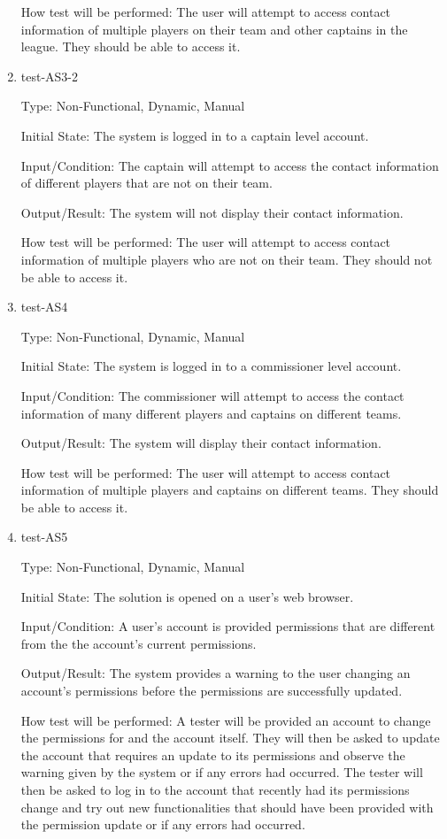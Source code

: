 \documentclass[12pt, titlepage]{article}
\begin{document}
\begin{enumerate}
  How test will be performed: The user will attempt to access contact
  information of multiple players on their team and other captains in the
  league. They should be able to access it.

  \item{test-AS3-2\\}

  Type: Non-Functional, Dynamic, Manual

  Initial State: The system is logged in to a captain level account.

  Input/Condition: The captain will attempt to access the contact information
  of different players that are not on their team.

  Output/Result: The system will not display their contact information.

  How test will be performed: The user will attempt to access contact
  information of multiple players who are not on their team. They should not
  be able to access it.

  \item{test-AS4\\}

  Type: Non-Functional, Dynamic, Manual

  Initial State: The system is logged in to a commissioner level account.

  Input/Condition: The commissioner will attempt to access the contact
  information of many different players and captains on different teams.

  Output/Result: The system will display their contact information.

  How test will be performed: The user will attempt to access contact
  information of multiple players and captains on different teams. They should
  be able to access it.

  \item{test-AS5\\}

  Type: Non-Functional, Dynamic, Manual

  Initial State: The solution is opened on a user's web browser.

  Input/Condition: A user's account is provided permissions that are different from the
  the account's current permissions.

  Output/Result: The system provides a warning to the user changing an account's
  permissions before the permissions are successfully updated.

  How test will be performed: A tester will be provided an account to change the
  permissions for and the account itself. They will then be asked to update the account
  that requires an update to its permissions and observe the warning given by the system
  or if any errors had occurred. The tester will then be asked to log in to the account
  that recently had its permissions change and try out new functionalities that should
  have been provided with the permission update or if any errors had occurred.


\end{enumerate}
\end{document}
